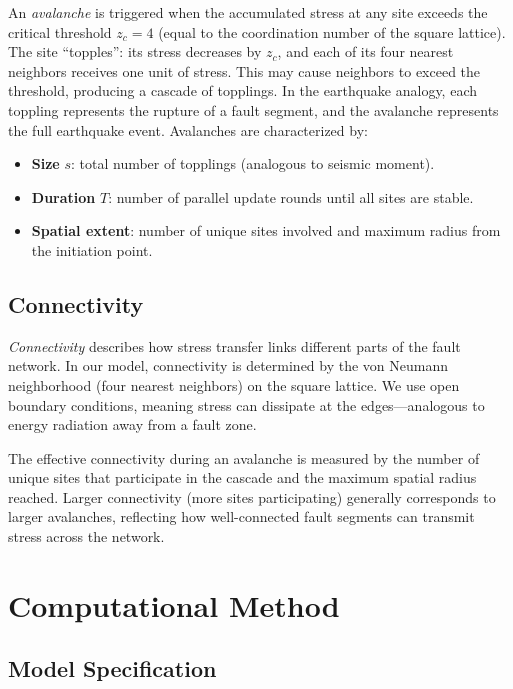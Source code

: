 \documentclass[12pt,a4paper]{article}
\begin{document}
An \textit{avalanche} is triggered when the accumulated stress at any site
exceeds the critical threshold $z_c = 4$ (equal to the coordination number
of the square lattice). The site ``topples'': its stress decreases by $z_c$,
and each of its four nearest neighbors receives one unit of stress. This
may cause neighbors to exceed the threshold, producing a cascade of
topplings. In the earthquake analogy, each toppling represents the rupture
of a fault segment, and the avalanche represents the full earthquake event.
Avalanches are characterized by:
\begin{itemize}
    \item \textbf{Size} $s$: total number of topplings (analogous to seismic
          moment).
    \item \textbf{Duration} $T$: number of parallel update rounds until all
          sites are stable.
    \item \textbf{Spatial extent}: number of unique sites involved and maximum
          radius from the initiation point.
\end{itemize}

\subsection{Connectivity}

\textit{Connectivity} describes how stress transfer links different parts
of the fault network. In our model, connectivity is determined by the
von Neumann neighborhood (four nearest neighbors) on the square lattice.
We use open boundary conditions, meaning stress can dissipate at the
edges---analogous to energy radiation away from a fault zone.

The effective connectivity during an avalanche is measured by the number
of unique sites that participate in the cascade and the maximum spatial
radius reached. Larger connectivity (more sites participating) generally
corresponds to larger avalanches, reflecting how well-connected fault
segments can transmit stress across the network.

\section{Computational Method}

\subsection{Model Specification}
\end{document}
